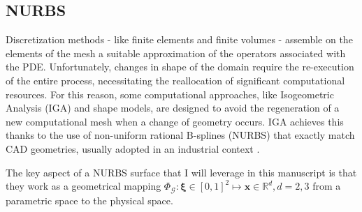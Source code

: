 \documentclass[11pt]{article}
\begin{document}
\subsection{NURBS}
Discretization methods - like finite elements and finite volumes - assemble on the elements of the mesh a suitable approximation of the operators associated with the PDE. Unfortunately, changes in shape of the domain require the re-execution of the entire process, necessitating the reallocation of significant computational resources.
For this reason, some computational approaches, like
Isogeometric Analysis (IGA) and shape models, are designed to avoid the regeneration of a new computational mesh when a change of geometry occurs.
IGA achieves this thanks to the use of non-uniform rational B-splines (NURBS) \cite{piegl1996nurbs} that exactly match CAD geometries, usually adopted in an industrial context \cite{hughes2005isogeometric}.

The key aspect of a NURBS surface that I will leverage in this manuscript is that they work as a geometrical mapping $\Phi_{\mathcal G}: \boldsymbol \xi \in [0, 1]^2 \mapsto \mathbf x \in \mathbb R^d, d=2,3$ from a parametric space to the physical space.
\end{document}
